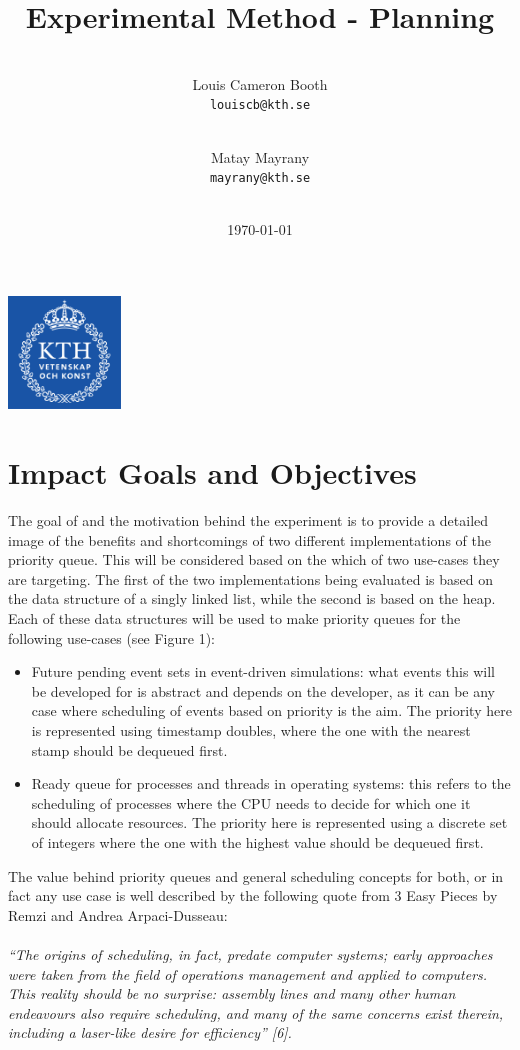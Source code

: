 \documentclass[12pt]{article}
\title{Experimental Method - Planning}
\author{
\\
  Louis Cameron Booth\\
  \texttt{louiscb@kth.se}
  \and
  \\
  Matay Mayrany\\
  \texttt{mayrany@kth.se}
  \\
  \\
}
\date{\today}
\begin{document}
\maketitle

\begin{center}
\includegraphics[width=3cm]{logo.png}
\end{center}

\pagebreak
\tableofcontents
\newpage
\section{Impact Goals and Objectives}

 The goal of and the motivation behind the experiment is to provide a detailed image of the benefits and shortcomings of two different implementations of the priority queue. This will be considered based on the which of two use-cases they are targeting. The first of the two implementations being evaluated is based on the data structure of a singly linked list, while the second is based on the heap. 
Each of these data structures will be used to make priority queues for the following use-cases (see Figure 1): 

\begin{itemize}
   \item Future pending event sets in event-driven simulations: what events this will be developed for is abstract and depends on the developer, as it can be any case where scheduling of events based on priority is the aim. The priority here is represented using timestamp doubles, where the one with the nearest stamp should be dequeued first.
   \item Ready queue for processes and threads in operating systems:
 this refers to the scheduling of processes where the CPU needs to decide for which one it should allocate resources. The priority here is represented using a discrete set of integers where the one with the highest value should be dequeued first. \end{itemize}

The value behind priority queues and general scheduling concepts for both, or in fact any use case is well described by the following quote from 3 Easy Pieces by Remzi and Andrea Arpaci-Dusseau:
\\
\\
 \textit{“The origins of scheduling, in fact, predate computer systems; early approaches were taken from the field of operations management and applied to computers. This reality should be no surprise: assembly lines and many other human endeavours also require scheduling, and many of the same concerns exist therein, including a laser-like desire for efficiency” [6].} \\
\end{document}
